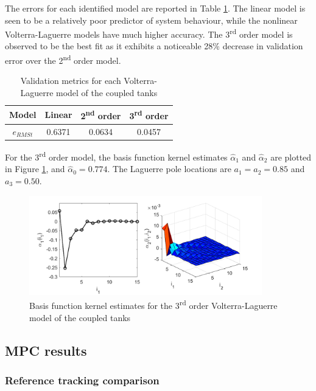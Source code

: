 The errors for each identified model are reported in Table \ref{tab:CoupledTanksVal}. The linear model is seen to be a relatively poor predictor of system behaviour, while the nonlinear Volterra-Laguerre models have much higher accuracy. The 3\textsuperscript{rd} order model is observed to be the best fit as it exhibits a noticeable 28\% decrease in validation error over the 2\textsuperscript{nd} order model. 

\begin{table}[h]
\centering
\caption{Validation metrics for each Volterra-Laguerre model of the coupled tanks}\label{tab:NRMSE_CED}
\begin{tabular}{|c||c|c|c|}
\hline
\textbf{Model} & Linear & 2\textsuperscript{nd} order & 3\textsuperscript{rd} order \\
\hline
\textbf{$e_{RMSt}$} & 0.6371 & 0.0634 & 0.0457 \\
\hline
\end{tabular}
\label{tab:CoupledTanksVal}
\end{table}

For the 3\textsuperscript{rd} order model, the basis function kernel estimates $\hat{\alpha}_1$ and $\hat{\alpha}_2$ are plotted in Figure \ref{fig:CoupledTanksKernels}, and $\hat{\alpha}_0 = 0.774$. The Laguerre pole locations are $a_1 = a_2 = 0.85$ and $a_3 = 0.50$.

\begin{figure}[h]
\centering
\includegraphics[width=0.9\textwidth]{Chapter11_ControlStudy/CoupledTanks3rdOrderKernels.pdf}
\caption{Basis function kernel estimates for the 3\textsuperscript{rd} order Volterra-Laguerre model of the coupled tanks}
\label{fig:CoupledTanksKernels}
\end{figure}

\subsection{MPC results}

\subsubsection{Reference tracking comparison}

